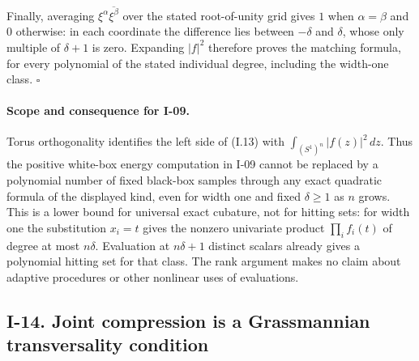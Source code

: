 Finally, averaging $\xi^\alpha\overline{\xi^\beta}$ over the stated
root-of-unity grid gives $1$ when $\alpha=\beta$ and $0$ otherwise:
in each coordinate the difference lies between $-\delta$ and
$\delta$, whose only multiple of $\delta+1$ is zero.  Expanding
$|f|^2$ therefore proves the matching formula, for every polynomial
of the stated individual degree, including the width-one class.
\hfill$\square$

\paragraph{Scope and consequence for I-09.}
Torus orthogonality identifies the left side of (I.13) with
$\int_{(S^1)^n}|f(z)|^2\,dz$.  Thus the positive white-box energy
computation in I-09 cannot be replaced by a polynomial number of
fixed black-box samples through any exact quadratic formula of the
displayed kind, even for width one and fixed $\delta\ge1$ as $n$ grows.
This is a lower bound for universal exact cubature, not for hitting
sets: for width one the substitution $x_i=t$ gives the nonzero
univariate product $\prod_i f_i(t)$ of degree at most $n\delta$.
Evaluation at $n\delta+1$ distinct scalars already gives a polynomial
hitting set for that class.  The rank argument makes no claim about
adaptive procedures or other nonlinear uses of evaluations.

\subsection{I-14. Joint compression is a Grassmannian transversality condition}
\label{I-14}

